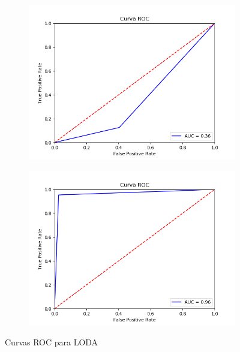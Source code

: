 \begin{figure}[H]
	\centering
	\begin{subfigure}{.49\textwidth}
		\centering
		\includegraphics[scale=0.42]{imagenes/imgs-exp1/roc/LODA_satellite}
	\end{subfigure}
	\begin{subfigure}{.49\textwidth}
		\centering
		\includegraphics[scale=0.42]{imagenes/imgs-exp1/roc/LODA_breastw}
	\end{subfigure}
	\caption{Curvas ROC para LODA}
	\label{ROC_LODA}
\end{figure}

